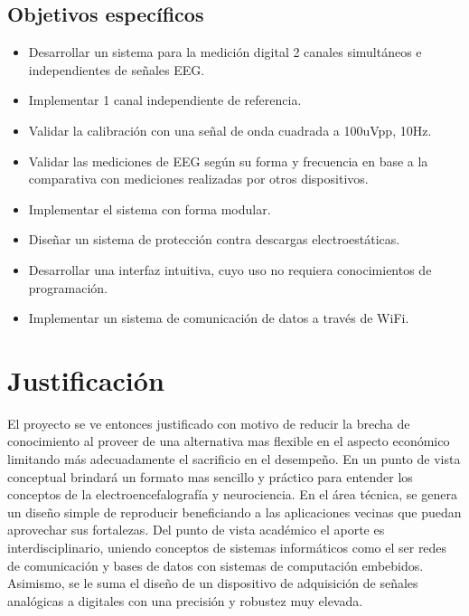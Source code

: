 \subsection{Objetivos específicos}
\label{sec:org5227f2c}
\begin{itemize}
\item Desarrollar un sistema para la medición digital 2 canales simultáneos e independientes de señales EEG.\\
\item Implementar 1 canal independiente de referencia.\\
\item Validar la calibración con una señal de onda cuadrada a 100uVpp, 10Hz.\\
\item Validar las mediciones de EEG según su forma y frecuencia en base a la comparativa con mediciones realizadas por otros dispositivos.\\
\item Implementar el sistema con forma modular.\\
\item Diseñar un sistema de protección contra descargas electroestáticas.\\
\item Desarrollar una interfaz intuitiva, cuyo uso no requiera conocimientos de programación.\\
\item Implementar un sistema de comunicación de datos a través de WiFi.\\
\end{itemize}

\section{Justificación}
\label{sec:orgf60b767}
El proyecto se ve entonces justificado con motivo de reducir la brecha de conocimiento al proveer de una alternativa mas flexible en el aspecto económico limitando más adecuadamente el sacrificio en el desempeño. En un punto de vista conceptual brindará un formato mas sencillo y práctico para entender los conceptos de la electroencefalografía y neurociencia. En el área técnica, se genera un diseño simple de reproducir beneficiando a las aplicaciones vecinas que puedan aprovechar sus fortalezas. Del punto de vista académico el aporte es interdisciplinario, uniendo conceptos de sistemas informáticos como el ser redes de comunicación y bases de datos con sistemas de computación embebidos. Asimismo, se le suma el diseño de un dispositivo de adquisición de señales analógicas a digitales con una precisión y robustez muy elevada.\\

